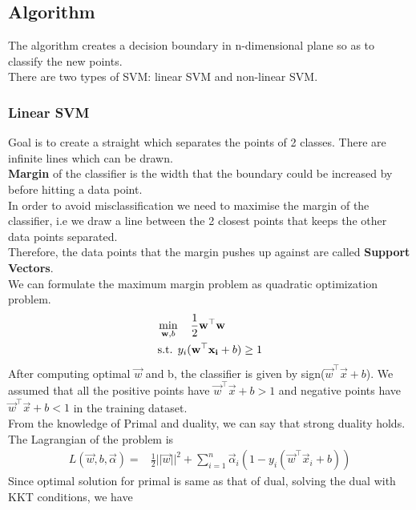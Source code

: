 \documentclass[12pt,letterpaper, onecolumn]{exam}
\begin{document}
\subsection*{Algorithm}
The algorithm creates a decision boundary in n-dimensional plane so as to classify the new points.\\ 
There are two types of SVM: linear SVM and non-linear SVM.
\subsubsection*{Linear SVM}
Goal is to create a straight which separates the points of 2 classes. There are infinite lines which can be drawn. \\
\textbf{Margin} of the classifier is the width that the boundary could be increased by before hitting a data point.\\
In order to avoid misclassification we need to maximise the margin of the classifier, i.e we draw a line between the 2 closest points that keeps the other data points separated.\\
Therefore, the data points that the margin pushes up against are called \textbf{Support Vectors}.\\
We can formulate the maximum margin problem as quadratic optimization problem.
\begin{equation}
\begin{aligned}
\min_{\vec{w},b} & \hspace{4mm} \frac{1}{2}\vec{w}^\top \vec{w} \\
\textrm{s.t.   } & y_{i}(\vec{w}^\top \vec{x_i}+b)\geq 1
\end{aligned}
\end{equation}
After computing optimal $\vec{w}$ and b, the classifier is given by
sign($\vec{w}^\top \vec{x}+b$). We assumed that all the positive points have $\vec{w}^\top \vec{x}+b > 1$ and negative points have 
$\vec{w}^\top \vec{x}+b < 1$ in the training dataset.\\
From the knowledge of Primal and duality, we can say that strong duality holds. The Lagrangian of the problem is 
\begin{equation}
\begin{aligned}
L(\vec{w},b,\vec{\alpha}) = {}& \frac{1}{2}||\vec{w}||^2 + \sum_{i = 1}^n \vec{\alpha}_i(1-y_i(\vec{w}^\top \vec{x}_i+b))
\end{aligned}
\end{equation}
Since optimal solution for primal is same as that of dual, solving the dual with KKT conditions, we have 
\end{document}
